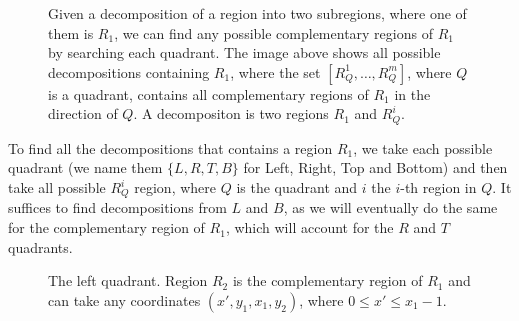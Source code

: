 \documentclass{amsart}
\theoremstyle{plain}
\numberwithin{equation}{section}
\begin{document}
\begin{figure}[h]
  \centering
  \captionsetup{justification=raggedright}
  \caption{Given a decomposition of a region into two subregions, where one of them is $R_1$, we
  can find any possible complementary regions of $R_1$ by searching each quadrant. The image above
  shows all possible decompositions containing $R_1$, where the set $[R_Q^1,\ldots,R_Q^m]$, where
  $Q$ is a quadrant, contains all complementary regions of $R_1$ in the direction of $Q$. A
  decompositon is two regions $R_1$ and $R_Q^i$.}
\end{figure}

To find all the decompositions that contains a region $R_1$, we take each possible quadrant (we
name them $\{L,R,T,B\}$ for Left, Right, Top and Bottom) and then take all possible $R_Q^i$ region,
where $Q$ is the quadrant and $i$ the $i$-th region in $Q$. It suffices to find decompositions from
$L$ and $B$, as we will eventually do the same for the complementary region of $R_1$, which will
account for the $R$ and $T$ quadrants.

\begin{figure}[h]
  \centering
  \captionsetup{justification=raggedright}
  \caption{The left quadrant. Region $R_2$ is the complementary region of $R_1$ and can take any
  coordinates $(x',y_1,x_1,y_2)$, where $0\leq x'\leq x_1-1$.\label{fig:left-quadrant}}
\end{figure}
\end{document}

